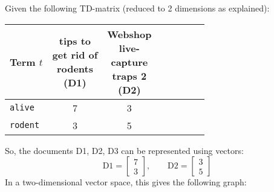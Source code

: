         		Given the following TD-matrix (reduced to 2 dimensions as explained):
                \begin{table}[H]
                    \centering
                    \begin{tabular}{|l|c|c|c|c|c|c|c|}
                        \hline
                        \textbf{Term} \(t\) & \makecell{tips to \\ get rid of \\ rodents \\ (D1)} & \makecell{Webshop \\ live- \\ capture \\ traps 2 \\ (D2)} \\ \hline
                        \texttt{alive}  &         7          &         3          \\ \hline
                        \texttt{rodent} &         3          &         5          \\ \hline
                    \end{tabular}
                \end{table}
            	So, the documents D1, D2, D3 can be represented using vectors:
            	\begin{equation*}
                	\text{D1} =
                		\begin{bmatrix}
	                		7 \\
	                		3
                		\end{bmatrix},
                	\quad\quad
                	\text{D2} =
                		\begin{bmatrix}
	                		3 \\
	                		5
                		\end{bmatrix}
            	\end{equation*}
            	In a two-dimensional vector space, this gives the following graph:
            	\begin{figure}[H]
            		\centering
            	\end{figure}

